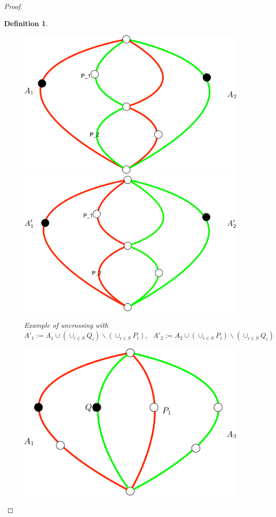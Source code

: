 \documentclass[letterpaper,11pt]{article}
\newtheorem{definition}[theorem]{Definition}
\newcommand{\0}{\mathbb{0}}
\newcommand{\1}{\mathbb{1}}
\begin{document}
\begin{proof}
\begin{definition}
\begin{figure}[H]
\includegraphics[scale=0.28]{CrossingCycle1.png}    \hspace{2cm}
\includegraphics[scale=0.25]{Uncrossed1.png} 
\caption{ Example of uncrossing with $ A'_1 := A_1 \cup  (\cup_{i \in S}  Q_i ) \backslash (\cup_{i \in S}  P_i ) ,  \ \ \ A'_2 :=  A_2 \cup  (\cup_{i \in S}  P_i ) \backslash (\cup_{i \in S}  Q_i )  $  }
\label{defcross}
\end{figure}  %
\begin{figure}
  \includegraphics[scale=0.25]{CrossingCycle2.png}  \hspace{2cm}

\end{figure}
\end{definition}
\end{proof}
\end{document}
